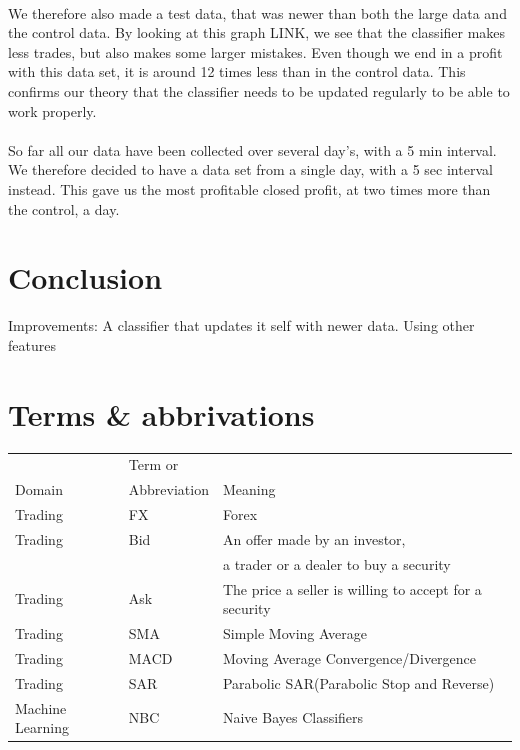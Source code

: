 \documentclass[10pt]{IEEEtran}
\begin{document}
\\
We therefore also made a test data, that was newer than both the large data and the control data. By looking at this graph LINK, we see that the classifier makes less trades, but also makes some larger mistakes. Even though we end in a profit with this data set, it is around 12 times less than in the control data. This confirms our theory that the classifier needs to be updated regularly to be able to work properly.
\\
\\
So far all our data have been collected over several day's, with a 5 min interval. We therefore decided to have a data set from a single day, with a 5 sec interval instead. This gave us the most profitable closed profit, at two times more than the control, a day.\\


\section{Conclusion}


Improvements:
A classifier that updates it self with newer data.
Using other features

\section{Terms \& abbrivations}
\begin{tabular}{l | l | l}
& Term or &\\
Domain & Abbreviation & Meaning\\
\hline
Trading & FX & Forex \\ 
Trading & Bid & An offer made by an investor,\\
& & a trader or a dealer to buy a security\\
Trading & Ask & The price a seller is willing to accept for a security\\
Trading & SMA & Simple Moving Average\\
Trading & MACD & Moving Average Convergence/Divergence\\
Trading & SAR & Parabolic SAR(Parabolic Stop and Reverse)\\
Machine Learning & NBC & Naive Bayes Classifiers\\
\end{tabular}




\end{document}
